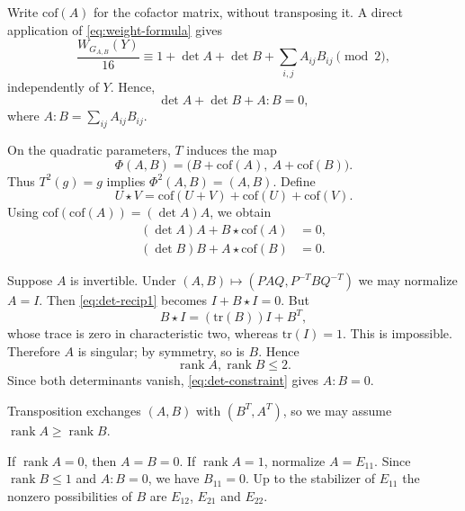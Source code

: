 \documentclass[11pt]{article}
\newtheorem{open problem}{Open problem}
\begin{document}
\begin{appendix}
Write $\text{cof}(A)$ for the cofactor matrix, without transposing it. A direct
application of \eqref{eq:weight-formula} gives
\begin{equation}
\frac{W_{G_{A,B}}(Y)}{16}
\equiv
1+\det A+\det B+\sum_{i,j}A_{ij}B_{ij}
\pmod2,
\label{eq:det-walsh}
\end{equation}
independently of $Y$. Hence,
\begin{equation}
\det A+\det B+A:B=0,
\label{eq:det-constraint}
\end{equation}
where $A:B=\sum_{ij}A_{ij}B_{ij}$.

On the quadratic parameters, $T$ induces the map
\begin{equation}
\Phi(A,B)=
\bigl(B+\text{cof}(A),\ A+\text{cof}(B)\bigr).
\label{eq:det-Phi}
\end{equation}
Thus $T^2(g)=g$ implies $\Phi^2(A,B)=(A,B)$.
Define
\[
U\star V=\text{cof}(U+V)+\text{cof}(U)+\text{cof}(V).
\]
Using $\text{cof}(\text{cof}(A))=(\det A)A$,
we obtain
\begin{align}
(\det A)A+B\star \text{cof}(A)&=0,\label{eq:det-recip1}\\
(\det B)B+A\star \text{cof}(B)&=0.\label{eq:det-recip2}
\end{align}

Suppose $A$ is invertible. Under
$
(A,B)\longmapsto(PAQ,P^{-T}BQ^{-T})
$
we may normalize $A=I$. Then \eqref{eq:det-recip1} becomes
$
I+B\star I=0.
$
But
\begin{equation}
B\star I=(\text{tr}(B))I+B^T,
\end{equation}
whose trace is zero in characteristic two, whereas $\text{tr}(I)=1$. This is impossible.
Therefore $A$ is singular; by symmetry, so is $B$.
Hence
\begin{equation}
\operatorname{rank} A,\operatorname{rank} B\le2.
\label{eq:det-rank}
\end{equation}
Since both determinants vanish, \eqref{eq:det-constraint} gives
$
A:B=0.
$

Transposition exchanges $(A,B)$ with $(B^T,A^T)$, so we may assume
$\operatorname{rank} A\ge\operatorname{rank} B$.

If $\operatorname{rank} A=0$, then $A=B=0$.
If $\operatorname{rank} A=1$, normalize $A=E_{11}$. Since $\operatorname{rank} B\le1$ and
$A:B=0$, we have $B_{11}=0$. Up to the stabilizer of $E_{11}$ the nonzero
possibilities of $B$ are $E_{12}$, $E_{21}$ and $E_{22}$.


\end{appendix}
\end{document}
